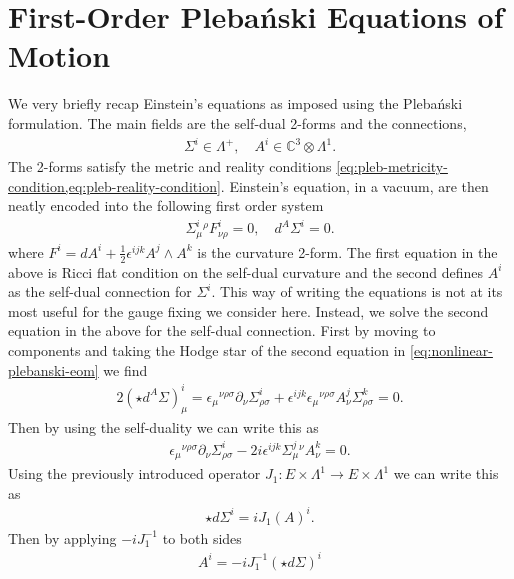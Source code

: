 \documentclass[10pt]{report}
\newcommand{\pleb}[0]{Pleba\'nski}
\theoremstyle{definition}
\newcommand{\C}[0]{\mathbb{C}}
\begin{document}
        \section{First-Order \pleb{} Equations of Motion}
        We very briefly recap Einstein's equations as imposed using the \pleb{} formulation. The main fields are the self-dual 2-forms and the connections,
        \begin{align}
            \Sigma^i \in \Lambda^+, \quad A^i \in \C^3 \otimes \Lambda^1.
        \end{align}
        The 2-forms satisfy the metric and reality conditions \cref{eq:pleb-metricity-condition,eq:pleb-reality-condition}. Einstein's equation, in a vacuum, are then neatly encoded into the following first order system
        \begin{align}
            \Sigma^i_\mu{}^\rho F^i_{\nu\rho} = 0, \quad d^A \Sigma^i = 0. \label{eq:nonlinear-plebanski-eom}
        \end{align}
        where $F^i = dA^i + \frac{1}{2} \epsilon^{ijk} A^j \wedge A^k$ is the curvature 2-form. The first equation in the above is Ricci flat condition on the self-dual curvature and the second defines $A^i$ as the self-dual connection for $\Sigma^i$. This way of writing the equations is not at its most useful for the gauge fixing we consider here. Instead, we solve the second equation in the above for the self-dual connection.  First by moving to components and taking the Hodge star of the second equation in \cref{eq:nonlinear-plebanski-eom} we find 
        \begin{align}
            2 (\star d^A \Sigma)^i_\mu = \epsilon_\mu{}^{\nu\rho\sigma} \partial_\nu \Sigma^i_{\rho\sigma} + \epsilon^{ijk} \epsilon_\mu{}^{\nu\rho\sigma} A^j_\nu \Sigma^k_{\rho\sigma} = 0.
        \end{align}
        Then by using the self-duality we can write this as 
        \begin{align}
            \epsilon_\mu{}^{\nu\rho\sigma} \partial_\nu \Sigma^i_{\rho\sigma} - 2 i \epsilon^{ijk} \Sigma^j_\mu{}^\nu A^k_\nu = 0.
        \end{align}
        Using the previously introduced operator $J_1: E \times \Lambda^1 \rightarrow E \times \Lambda^1$ we can write this as 
        \begin{align}
            \star d \Sigma^i = i J_1(A)^i.
        \end{align}
        Then by applying $-i J_1^{-1}$ to both sides 
        \begin{align}
            A^i = -i J_1^{-1}(\star d \Sigma)^i
        \end{align}
\end{document}
